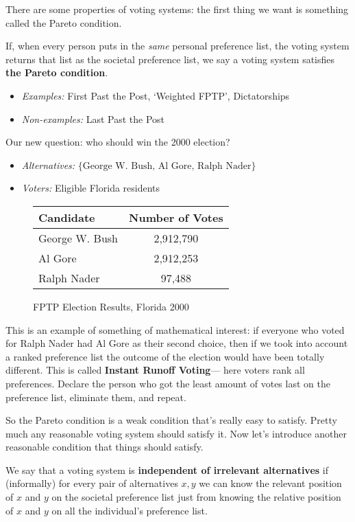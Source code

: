 There are some properties of voting systems: the first thing we want is something called the Pareto condition.
\begin{definition}
    If, when every person puts in the \emph{same} personal preference list, the voting system returns that list as the societal preference list, we say a voting system satisfies \textbf{the Pareto condition}.
    \begin{itemize}
        \item \emph{Examples:} First Past the Post, `Weighted FPTP', Dictatorships
        \item \emph{Non-examples:} Last Past the Post
    \end{itemize}
\end{definition}
\begin{example}
    Our new question: who should win the 2000 election?
    \begin{itemize}
        \item \emph{Alternatives:} $\{\text{George W. Bush, Al Gore, Ralph Nader}\} $ 
        \item \emph{Voters:} Eligible Florida residents
    \end{itemize}
    \begin{figure}[H]
    \centering
    \begin{tabular}{l|c}
        Candidate & Number of Votes\\
        \hline
        \hline
        George W. Bush & 2,912,790\\
        Al Gore & 2,912,253\\
        Ralph Nader & 97,488
    \end{tabular}
    \label{election}
    \caption{FPTP Election Results, Florida 2000}
    \end{figure}
    This is an example of something of mathematical interest: if everyone who voted for Ralph Nader had Al Gore as their second choice, then if we took into account a ranked preference list the outcome of the election would have been totally different. This is called \textbf{Instant Runoff Voting}— here voters rank all preferences. Declare the person who got the least amount of votes last on the preference list, eliminate them, and repeat.
\end{example}
So the Pareto condition is a weak condition that's really easy to satisfy. Pretty much any reasonable voting system should satisfy it. Now let's introduce another reasonable condition that things should satisfy.
\begin{definition}
    We say that a voting system is \textbf{independent of irrelevant alternatives} if (informally) for every pair of alternatives $x,y$ we can know the relevant position of $x$ and $y$ on the societal preference list just from knowing the relative position of $x$ and $y$ on all the individual's preference list.
\end{definition}
